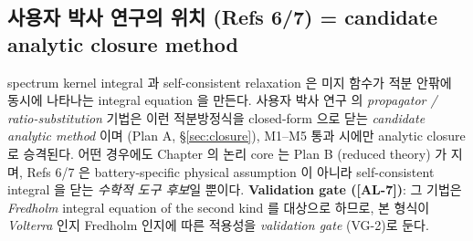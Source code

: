 \documentclass[11pt,a4paper]{article}
\newcommand{\AL}[1]{\textsf{[AL-#1]}}
\begin{document}
\subsection{사용자 박사 연구의 위치 (Refs 6/7) = candidate analytic closure method}\label{sec:phd}
spectrum kernel integral 과 self-consistent relaxation 은 미지 함수가 적분 안팎에 동시에
나타나는 integral equation 을 만든다. 사용자 박사 연구 \cite{lee2011,son2013} 의
\emph{propagator / ratio-substitution} 기법은 이런 적분방정식을 closed-form 으로 닫는
\emph{candidate analytic method} 이며 (Plan A, \S\ref{sec:closure}), M1--M5 통과 시에만
analytic closure 로 승격된다. 어떤 경우에도 Chapter 의 논리 core 는 Plan B (reduced theory)
가 지며, Refs 6/7 은 battery-specific physical assumption 이 아니라 self-consistent integral
을 닫는 \emph{수학적 도구 후보}일 뿐이다. \textbf{Validation gate (\AL{7})}: 그 기법은
\emph{Fredholm} integral equation of the second kind 를 대상으로 하므로, 본 형식이
\emph{Volterra} 인지 Fredholm 인지에 따른 적용성을 \emph{validation gate} (VG-2)로 둔다.
\end{document}

